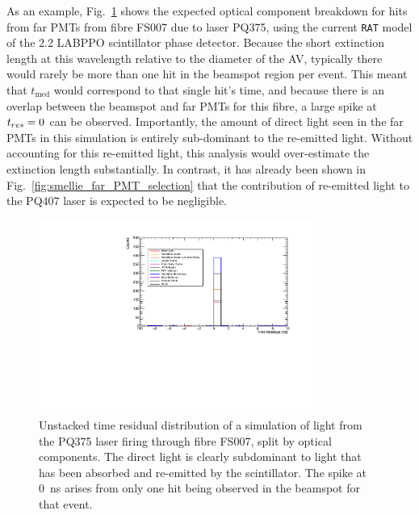As an example, Fig.~\ref{fig:smellie_PQ375_far_pmts_components} shows the expected optical component breakdown for hits from far PMTs from fibre FS007 due to laser PQ375, using the current \texttt{RAT} model of the \SI{2.2}{\gpl} LABPPO scintillator phase detector. Because the short extinction length at this wavelength relative to the diameter of the AV, typically there would rarely be more than one hit in the beamspot region per event. This meant that $t_{\mathrm{med}}$ would correspond to that single hit's time, and because there is an overlap between the beamspot and far PMTs for this fibre, a large spike at $t_{res}{} = 0$ can be observed. Importantly, the amount of direct light seen in the far PMTs in this simulation is entirely sub-dominant to the re-emitted light. Without accounting for this re-emitted light, this analysis would over-estimate the extinction length substantially. In contrast, it has already been shown in Fig.~\ref{fig:smellie_far_PMT_selection} that the contribution of re-emitted light to the PQ407 laser is expected to be negligible.

\begin{figure}
    \centering
    \includegraphics[width=0.8\textwidth]{5_SMELLIEAnalysis/images/far_pmts_tres_plot_FS007_PQ375.pdf}
    \caption[Unstacked time residual distribution of a simulation of light from the PQ375 laser firing through fibre FS007, split by optical components]
    {Unstacked time residual distribution of a simulation of light from the PQ375 laser firing through fibre FS007, split by optical components. The direct light is clearly subdominant to light that has been absorbed and re-emitted by the scintillator. The spike at \SI{0}{\ns} arises from only one hit being observed in the beamspot for that event.}
    \label{fig:smellie_PQ375_far_pmts_components}
\end{figure}

